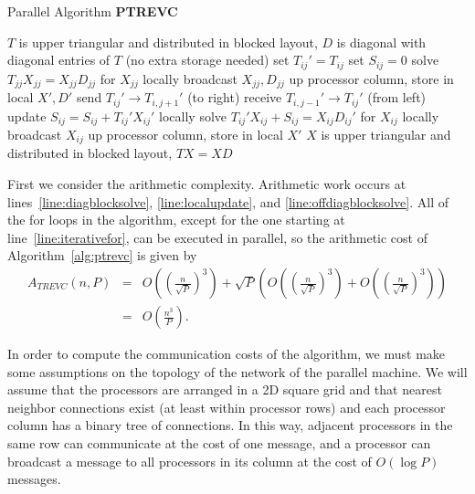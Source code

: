 \documentclass{article}
\def\lt{\left}
\def\rt{\right}
\newcommand{\ra}{\rightarrow}
\theoremstyle{definition}
\begin{document}
 \begin{algorithm}
\protect\caption{Parallel Algorithm \textbf{PTREVC}}
\label{alg:ptrevc}
\begin{algorithmic}[1]
\REQUIRE $T$ is upper triangular and distributed in blocked layout, $D$ is diagonal with diagonal entries of $T$ (no extra storage needed)
	\STATE set $T_{ij}'=T_{ij}$
	\STATE set $S_{ij}=0$
\ENDFOR
{}
	\STATE solve $T_{jj}X_{jj}=X_{jj}D_{jj}$ for $X_{jj}$ locally
	\label{line:diagblocksolve}
	\STATE broadcast $X_{jj},D_{jj}$ up processor column, store in local $X',D'$
	\label{line:diagbroadcast}
\ENDFOR
{}
\label{line:iterativefor}
			\STATE send $T_{ij}' \ra T_{i,j+1}'$ (to right)
			\label{line:sendright}
		\ENDIF
			\STATE receive $T_{i,j-1}' \ra T_{ij}'$ (from left)
			\label{line:recvleft}
		\ENDIF
			\STATE update $S_{ij} = S_{ij} + T_{ij}'X_{ij}'$ locally
			\label{line:localupdate}
		\ENDIF
	\ENDFOR
		\STATE solve $T_{ij}'X_{ij}+S_{ij}=X_{ij}D_{ij}'$ for $X_{ij}$ locally
		\label{line:offdiagblocksolve}
		\STATE broadcast $X_{ij}$ up processor column, store in local $X'$
		\label{line:offdiagbroadcast}
	\ENDFOR
\ENDFOR
\ENSURE $X$ is upper triangular and distributed in blocked layout, $TX=XD$
\end{algorithmic}
\end{algorithm}

First we consider the arithmetic complexity.  Arithmetic work occurs at lines~\ref{line:diagblocksolve}, \ref{line:localupdate}, and \ref{line:offdiagblocksolve}.  All of the for loops in the algorithm, except for the one starting at line~\ref{line:iterativefor}, can be executed in parallel, so the arithmetic cost of Algorithm~\ref{alg:ptrevc} is given by
\begin{eqnarray*}
A_{TREVC}(n,P) &=& O\lt(\lt( \frac{n}{\sqrt P} \rt)^3\rt) + \sqrt P \lt( O\lt(\lt( \frac{n}{\sqrt P} \rt)^3\rt) + O\lt(\lt( \frac{n}{\sqrt P} \rt)^3\rt) \rt) \\
 &=& O\lt(\frac{n^3}{P}\rt).
 \end{eqnarray*}

In order to compute the communication costs of the algorithm, we must make some assumptions on the topology of the network of the parallel machine.  We will assume that the processors are arranged in a 2D square grid and that nearest neighbor connections exist (at least within processor rows) and each processor column has a binary tree of connections.  In this way, adjacent processors in the same row can communicate at the cost of one message, and a processor can broadcast a message to all processors in its column at the cost of $O(\log P)$ messages.
\end{document}
